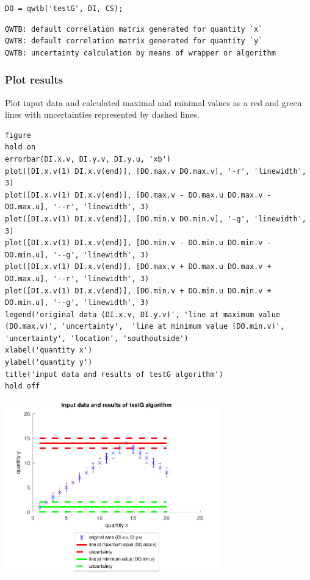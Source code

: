 \begin{lstlisting}
DO = qwtb('testG', DI, CS);
\end{lstlisting}
\begin{lstlisting}[language={},xleftmargin=5pt,frame=none]
QWTB: default correlation matrix generated for quantity `x`
QWTB: default correlation matrix generated for quantity `y`
QWTB: uncertainty calculation by means of wrapper or algorithm

\end{lstlisting}


{}
\subsubsection*{Plot results}



Plot input data and calculated maximal and minimal values as a red and green lines with
uncertainties represented by dashed lines.

\begin{lstlisting}
figure
hold on
errorbar(DI.x.v, DI.y.v, DI.y.u, 'xb')
plot([DI.x.v(1) DI.x.v(end)], [DO.max.v DO.max.v], '-r', 'linewidth', 3)
plot([DI.x.v(1) DI.x.v(end)], [DO.max.v - DO.max.u DO.max.v - DO.max.u], '--r', 'linewidth', 3)
plot([DI.x.v(1) DI.x.v(end)], [DO.min.v DO.min.v], '-g', 'linewidth', 3)
plot([DI.x.v(1) DI.x.v(end)], [DO.min.v - DO.min.u DO.min.v - DO.min.u], '--g', 'linewidth', 3)
plot([DI.x.v(1) DI.x.v(end)], [DO.max.v + DO.max.u DO.max.v + DO.max.u], '--r', 'linewidth', 3)
plot([DI.x.v(1) DI.x.v(end)], [DO.min.v + DO.min.u DO.min.v + DO.min.u], '--g', 'linewidth', 3)
legend('original data (DI.x.v, DI.y.v)', 'line at maximum value (DO.max.v)', 'uncertainty',  'line at minimum value (DO.min.v)', 'uncertainty', 'location', 'southoutside')
xlabel('quantity x')
ylabel('quantity y')
title('input data and results of testG algorithm')
hold off
\end{lstlisting}
\begin{center}
\includegraphics[width=0.7\textwidth]{algs_examples_published/testG_alg_example-1.pdf}
\end{center}


\stopcontents[localtoc]
